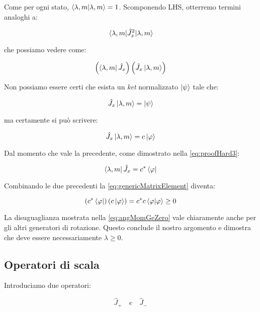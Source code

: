 Come per ogni stato, $\braket{\lambda, m}{\lambda, m} = 1$. Scomponendo LHS, otterremo termini analoghi a:

	\begin{equation} 
		\mel{\lambda, m}{\hat{J}_x^2}{\lambda, m}
	\end{equation}

che possiamo vedere come:

	\begin{equation} \label{eq:genericMatrixElement}
		\left ( \bra{\lambda, m} \hat{J}_x \right ) \left ( \hat{J}_x \ket{\lambda, m} \right )
	\end{equation}

Non possiamo essere certi che esista un \textit{ket} normalizzato $\ket{\psi}$ tale che:

	\begin{equation}
		\hat{J}_x \ket{\lambda, m} = \ket{\psi}
	\end{equation}

ma certamente si pu\`o scrivere:

	\begin{equation}
		\hat{J}_x \ket{\lambda, m} = c \ket{\varphi}
	\end{equation}

Dal momento che vale la precedente, come dimostrato nella \eqref{eq:proofHard3}:

	\begin{equation}
		\bra{\lambda, m} \hat{J}_x = c^* \bra{\varphi}
	\end{equation}

Combinando le due precedenti la \eqref{eq:genericMatrixElement} diventa:

	\begin{equation} \label{eq:angMomGeZero}
		\left ( c^* \bra{\varphi} \right ) \left ( c \ket{\varphi} \right ) = c^*c \braket{\varphi}{\varphi} \ge 0
	\end{equation}

La disuguaglianza mostrata nella \eqref{eq:angMomGeZero} vale chiaramente anche per gli altri generatori di rotazione. Questo conclude il nostro argomento e dimostra che deve essere necessariamente $\lambda \ge 0$.

\subsection{Operatori di scala}

Introduciamo due operatori:

	\[
		\hat{J}_+ \quad e \quad \hat{J}_-
	\]

